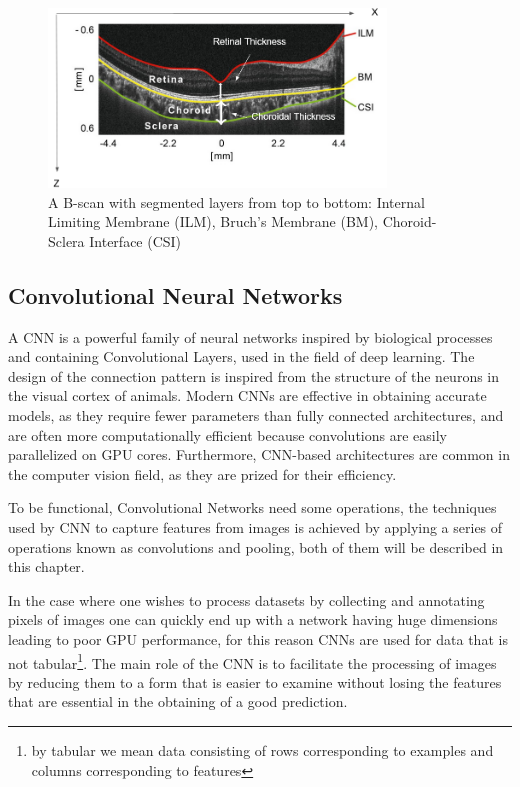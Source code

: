 \documentclass[12pt,a4paper]{scrartcl}
\begin{document}
\begin{figure}[H]
    \centering
    \includegraphics[width=0.8\textwidth]{./images/OCT-Scan.png}
    \caption{A B-scan with segmented layers from top to bottom:  Internal Limiting Membrane (ILM),  Bruch's Membrane (BM), Choroid-Sclera Interface (CSI) \cite{Ronchetti2019}}
    \label{fig:annotated-oct-scan}
\end{figure}

\subsection{Convolutional Neural Networks}\label{s:cnn}

A CNN is a powerful family of neural networks inspired by biological processes and containing Convolutional Layers, used in the field of deep learning. The design of the connection pattern is inspired from the structure of the neurons in the visual cortex of animals. Modern CNNs are effective in obtaining accurate models, as they require fewer parameters than fully connected architectures, and are often more computationally efficient because convolutions are easily parallelized on GPU cores\cite{DIDLBook}. Furthermore, CNN-based architectures are common in the computer vision field, as they are prized for their efficiency. 

To be functional, Convolutional Networks need some operations, the techniques used by CNN to capture features from images is achieved by applying a series of operations known as convolutions and pooling, both of them will be described in this chapter. 

In the case where one wishes to process datasets by collecting and annotating pixels of images one can quickly end up with a network having huge dimensions leading to poor GPU performance, for this reason CNNs are used for data that is not tabular\footnote{by tabular we mean data consisting of rows corresponding to examples and columns corresponding to features}\cite{DIDLBook}. The main role of the CNN is to facilitate the processing of images by reducing them to a form that is easier to examine without losing the features that are essential in the obtaining of a good prediction.
\end{document}
